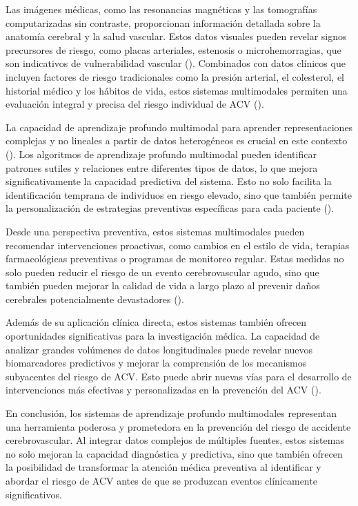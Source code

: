 Las imágenes médicas, como las resonancias magnéticas y las tomografías computarizadas sin contraste, proporcionan información detallada sobre la anatomía cerebral y la salud vascular. Estos datos visuales pueden revelar signos precursores de riesgo, como placas arteriales, estenosis o microhemorragias, que son indicativos de vulnerabilidad vascular (\cite{HUERFANO2016}). Combinados con datos clínicos que incluyen factores de riesgo tradicionales como la presión arterial, el colesterol, el historial médico y los hábitos de vida, estos sistemas multimodales permiten una evaluación integral y precisa del riesgo individual de ACV (\cite{BORSOS2024102719}).
\newline

La capacidad de aprendizaje profundo multimodal para aprender representaciones complejas y no lineales a partir de datos heterogéneos es crucial en este contexto (\cite{SUN2023104482}). Los algoritmos de aprendizaje profundo multimodal pueden identificar patrones sutiles y relaciones entre diferentes tipos de datos, lo que mejora significativamente la capacidad predictiva del sistema. Esto no solo facilita la identificación temprana de individuos en riesgo elevado, sino que también permite la personalización de estrategias preventivas específicas para cada paciente (\cite{ngiam2011multimodal, ramachandram2017deep, esteva2019guide, litjens2017survey}).
\newline

Desde una perspectiva preventiva, estos sistemas multimodales pueden recomendar intervenciones proactivas, como cambios en el estilo de vida, terapias farmacológicas preventivas o programas de monitoreo regular. Estas medidas no solo pueden reducir el riesgo de un evento cerebrovascular agudo, sino que también pueden mejorar la calidad de vida a largo plazo al prevenir daños cerebrales potencialmente devastadores (\cite{esteva2019guide, litjens2017survey}).
\newline

Además de su aplicación clínica directa, estos sistemas también ofrecen oportunidades significativas para la investigación médica. La capacidad de analizar grandes volúmenes de datos longitudinales puede revelar nuevos biomarcadores predictivos y mejorar la comprensión de los mecanismos subyacentes del riesgo de ACV. Esto puede abrir nuevas vías para el desarrollo de intervenciones más efectivas y personalizadas en la prevención del ACV (\cite{esteva2019guide, litjens2017survey}).

\newline
En conclusión, los sistemas de aprendizaje profundo multimodales representan una herramienta poderosa y prometedora en la prevención del riesgo de accidente cerebrovascular. Al integrar datos complejos de múltiples fuentes, estos sistemas no solo mejoran la capacidad diagnóstica y predictiva, sino que también ofrecen la posibilidad de transformar la atención médica preventiva al identificar y abordar el riesgo de ACV antes de que se produzcan eventos clínicamente significativos.

